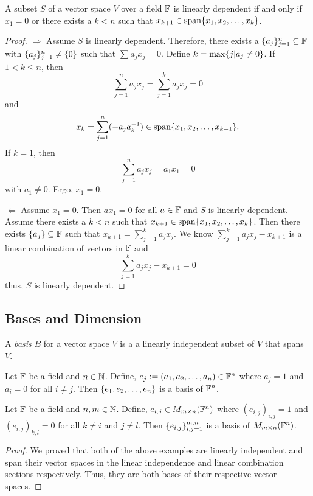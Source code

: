 \begin{thm}
	A subset $S$ of a vector space $V$ over a field $\mathbb{F}$ is linearly dependent if and only if $x_1=0$ or there exists a $k<n$ such that $x_{k+1}\in\operatorname{span} \lbrace x_1,x_2,\ldots,x_k \rbrace$.
\end{thm}
\begin{proof}
	$\Rightarrow$ Assume $S$ is linearly dependent.
	Therefore, there exists a $\lbrace a_j \rbrace_{j=1}^n\subseteq\mathbb{F}$ with $\lbrace a_j \rbrace_{j=1}^n\neq\lbrace 0 \rbrace$ such that $\sum a_jx_j=0$.
	Define $k=\max\lbrace j|a_j\neq 0 \rbrace$.
	If $1<k\leq n$, then
	\[
		\sum_{j=1}^n a_jx_j=\sum_{j=1}^k a_jx_j=0
	\]
	and
	\[
		x_k = \sum_{j=1}^n(-a_ja_k^{-1})\in\operatorname{span}\lbrace x_1,x_2,\ldots,x_{k-1} \rbrace.
	\]
	If $k=1$, then
	\[
		\sum_{j=1}^n a_jx_j=a_1x_1=0
	\]
	with $a_1\neq 0$.
	Ergo, $x_1=0$.

	$\Leftarrow$ Assume $x_1=0$.
	Then $ax_1=0$ for all $a\in\mathbb{F}$ and $S$ is linearly dependent.
	Assume there exists a $k<n$ such that $x_{k+1}\in\operatorname{span} \lbrace x_1,x_2,\ldots, x_k \rbrace$.
	Then there exists $\lbrace a_j \rbrace\subseteq\mathbb{F}$ such that $x_{k+1}=\sum_{j=1}^k a_jx_j$.
	We know $\sum_{j=1}^k a_jx_j - x_{k+1}$ is a linear combination of vectors in $\mathbb{F}$ and
	\[
		\sum_{j=1}^k a_jx_j - x_{k+1}=0
	\]
	thus, $S$ is linearly dependent.
\end{proof}

\pagebreak

\subsection{Bases and Dimension}

\begin{definition}
	A \textit{basis} $B$ for a vector space $V$ is a a linearly independent subset of $V$ that spans $V$.
\end{definition}

\begin{example}
	Let $\mathbb{F}$ be a field and $n\in\mathbb{N}$.
	Define, $e_j:=(a_1,a_2,\ldots,a_n)\in\mathbb{F}^n$ where $a_j=1$ and $a_i=0$ for all $i\neq j$.
	Then $\lbrace e_1,e_2,\ldots,e_n \rbrace$ is a basis of $\mathbb{F}^n$.
\end{example}

\begin{example}
	Let $\mathbb{F}$ be a field and $n,m\in\mathbb{N}$.
	Define, $e_{i,j}\in M_{m\times n}(\mathbb{F}^n)$ where $(e_{i,j})_{i,j}=1$ and $(e_{i,j})_{k,l}=0$ for all $k\neq i$ and $j\neq l$.
	Then $\lbrace e_{i,j} \rbrace_{i,j=1}^{m,n}$ is a basis of $M_{m\times n}(\mathbb{F}^n)$.
\end{example}
\begin{proof}
	We proved that both of the above examples are linearly independent and span their vector spaces in the linear independence and linear combination sections respectively.
	Thus, they are both bases of their respective vector spaces.
\end{proof}

